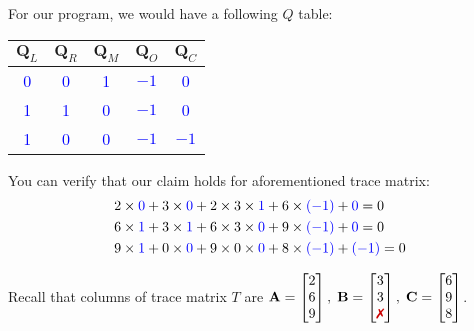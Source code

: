 \documentclass[../lecture-notes.tex]{subfiles}
\begin{document}
\begin{example}

For our program, we would have a following $Q$ table:
\begin{center}
\begin{tabular}{|c|c|c|c|c|}
\hline
\rowcolor{gray!30}$\mathbf{Q}_L$ & $\mathbf{Q}_R$ & $\mathbf{Q}_M$ & $\mathbf{Q}_O$ & $\mathbf{Q}_C$ \\ 
\hline
\textcolor{blue}{0} & \textcolor{blue}{0} & \textcolor{blue}{1} & \textcolor{blue}{$-1$} & \textcolor{blue}{0} \\ 
\hline
\textcolor{blue}{1} & \textcolor{blue}{1} & \textcolor{blue}{0} & \textcolor{blue}{$-1$} & \textcolor{blue}{0} \\ 
\hline
\textcolor{blue}{1} & \textcolor{blue}{0} & \textcolor{blue}{0} & \textcolor{blue}{$-1$} & \textcolor{blue}{$-1$} \\ 
\hline
\end{tabular}
\end{center}

You can verify that our claim holds for aforementioned trace matrix:
\begin{align*}
  &2 \times \textcolor{blue}{0} + 3 \times \textcolor{blue}{0} + 2 \times 3 \times \textcolor{blue}{1} + 6 \times \textcolor{blue}{(-1)} + \textcolor{blue}{0} = 0 \\
  &6 \times \textcolor{blue}{1} + 3 \times \textcolor{blue}{1} + 6 \times 3 \times \textcolor{blue}{0} + 9 \times \textcolor{blue}{(-1)} + \textcolor{blue}{0} = 0 \\
  &9 \times \textcolor{blue}{1} + 0 \times \textcolor{blue}{0} + 9 \times 0 \times \textcolor{blue}{0} + 8 \times \textcolor{blue}{(-1)} + \textcolor{blue}{(-1)} = 0 
\end{align*}

Recall that columns of trace matrix $T$ are $ \\ \mathbf{A} = \begin{bmatrix} 2 \\ 6 \\ 9 \end{bmatrix}, \;\mathbf{B} = \begin{bmatrix} 3 \\ 3 \\ \text{\xmark} \end{bmatrix}, \;\mathbf{C} = \begin{bmatrix} 6 \\ 9 \\ 8 \end{bmatrix}$.

\end{example}
\end{document}
